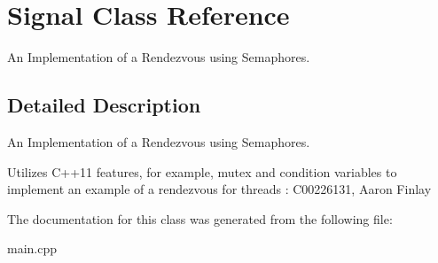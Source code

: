 \hypertarget{classSignal}{}\section{Signal Class Reference}
\label{classSignal}


An Implementation of a Rendezvous using Semaphores.  




\subsection{Detailed Description}
An Implementation of a Rendezvous using Semaphores. 

Utilizes C++11 features, for example, mutex and condition variables to implement an example of a rendezvous for threads \+: C00226131, Aaron Finlay 

The documentation for this class was generated from the following file\+:\begin{DoxyCompactItemize}
\item 
main.\+cpp\end{DoxyCompactItemize}
